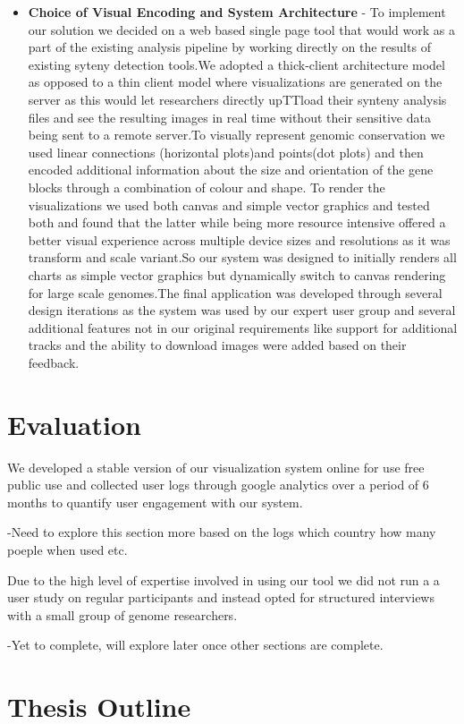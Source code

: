 \begin{itemize}
    \item \textbf{Choice of Visual Encoding and System Architecture} - 
    To implement our solution we decided on a web based single page tool that would work as a part of the existing analysis pipeline by working directly on the results of existing syteny detection tools.We adopted a thick-client architecture model as opposed to a thin client model where visualizations are generated on the server as this would let researchers directly upTTload their synteny analysis files and see the resulting images in real time without their sensitive data being sent to a remote server.To visually represent genomic conservation we used linear connections (horizontal plots)and points(dot plots) and then encoded additional information about the size and orientation of the gene blocks through a combination of colour and shape.
    To render the visualizations we used both canvas and simple vector graphics and tested both and found that the latter while being more resource intensive offered a better visual experience across multiple device sizes and resolutions as it was transform and scale variant.So our system was designed to initially renders all charts as simple vector graphics but dynamically switch to canvas rendering for large scale genomes.The final application was developed through several design iterations as the system was used by our expert user group and several additional features not in our original requirements like support for additional tracks and the ability to download images were added based on their feedback. 

\end{itemize}

\section{Evaluation}

We developed a stable version of our visualization system online for use free public use and collected user logs through google analytics over a period of 6 months to quantify user engagement with our system.

-Need to explore this section more based on the logs which country how many poeple when used etc.


Due to the high level of expertise involved in using our tool we did not run a a user study on regular participants and instead opted for structured interviews with a small group of genome researchers.

-Yet to complete, will explore later once other sections are complete.


\section{Thesis Outline}